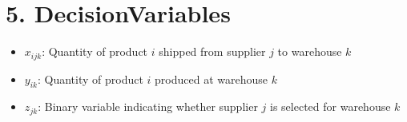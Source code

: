 \documentclass{article}
\begin{document}
\section{5. DecisionVariables}
\begin{itemize}
    \item $ x_{ijk} $: Quantity of product $ i $ shipped from supplier $ j $ to warehouse $ k $
    \item $ y_{ik} $: Quantity of product $ i $ produced at warehouse $ k $
    \item $ z_{jk} $: Binary variable indicating whether supplier $ j $ is selected for warehouse $ k $
\end{itemize}
\end{document}
